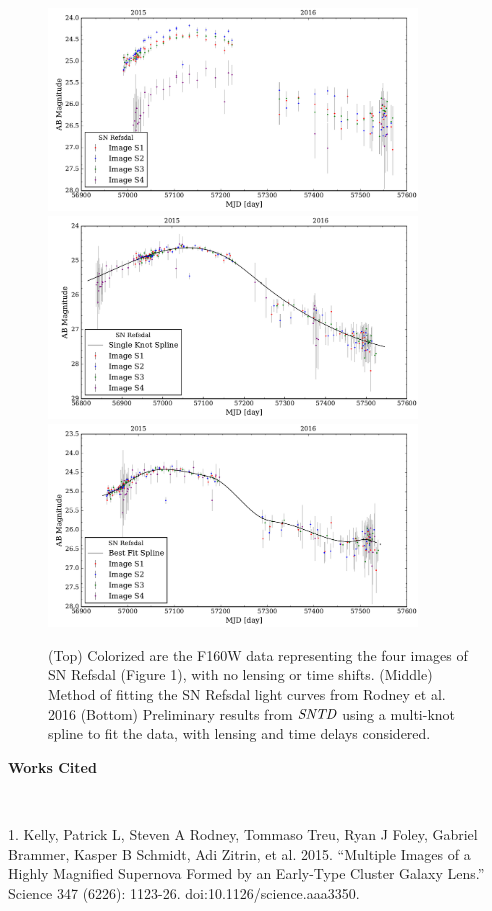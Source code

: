 \begin{figure}[h]
\centering
\includegraphics[width=.9\textwidth,height=5.38cm]{points_plot_2017.pdf}
\includegraphics[width=.9\textwidth,height=5.38cm]{ref_plot_2017.pdf}
\includegraphics[width=.9\textwidth,height=5.38cm]{gra_plot_2017.pdf}
\caption{(Top) Colorized are the F160W data representing the four images of SN Refsdal (Figure 1), with no lensing or time shifts. (Middle) Method of fitting the SN Refsdal light curves from Rodney et al. 2016 (Bottom) Preliminary results from $\textit{SNTD}$ using a multi-knot spline to fit the data, with lensing and time delays considered. }
\end{figure}

\pagebreak

\textbf{Works Cited}

\

1. Kelly, Patrick L, Steven A Rodney, Tommaso Treu, Ryan J Foley, Gabriel Brammer, Kasper B Schmidt, Adi Zitrin, et al. 2015. ``Multiple Images of a Highly Magnified Supernova Formed by an Early-Type Cluster Galaxy Lens.'' Science 347 (6226): 1123-26. doi:10.1126/science.aaa3350.

